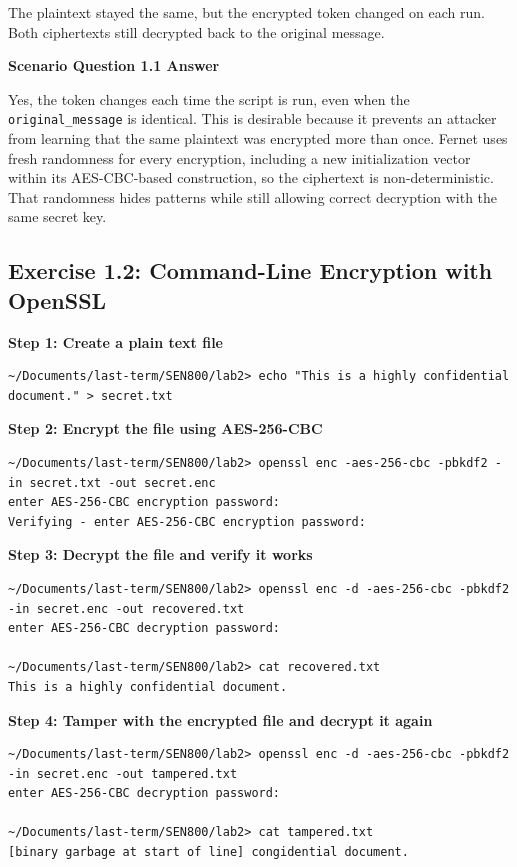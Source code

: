 \documentclass[12pt]{article}
\begin{document}
The plaintext stayed the same, but the encrypted token changed on each run. Both ciphertexts still decrypted back to the original message.

\textbf{Scenario Question 1.1 Answer}

Yes, the token changes each time the script is run, even when the \texttt{original\_message} is identical. This is desirable because it prevents an attacker from learning that the same plaintext was encrypted more than once. Fernet uses fresh randomness for every encryption, including a new initialization vector within its AES-CBC-based construction, so the ciphertext is non-deterministic. That randomness hides patterns while still allowing correct decryption with the same secret key.

\subsection*{Exercise 1.2: Command-Line Encryption with OpenSSL}

\textbf{Step 1: Create a plain text file}

\begin{lstlisting}[style=terminal]
~/Documents/last-term/SEN800/lab2> echo "This is a highly confidential document." > secret.txt
\end{lstlisting}

\textbf{Step 2: Encrypt the file using AES-256-CBC}

\begin{lstlisting}[style=terminal]
~/Documents/last-term/SEN800/lab2> openssl enc -aes-256-cbc -pbkdf2 -in secret.txt -out secret.enc
enter AES-256-CBC encryption password:
Verifying - enter AES-256-CBC encryption password:
\end{lstlisting}

\textbf{Step 3: Decrypt the file and verify it works}

\begin{lstlisting}[style=terminal]
~/Documents/last-term/SEN800/lab2> openssl enc -d -aes-256-cbc -pbkdf2 -in secret.enc -out recovered.txt
enter AES-256-CBC decryption password:

~/Documents/last-term/SEN800/lab2> cat recovered.txt
This is a highly confidential document.
\end{lstlisting}

\textbf{Step 4: Tamper with the encrypted file and decrypt it again}

\begin{lstlisting}[style=terminal]
~/Documents/last-term/SEN800/lab2> openssl enc -d -aes-256-cbc -pbkdf2 -in secret.enc -out tampered.txt
enter AES-256-CBC decryption password:

~/Documents/last-term/SEN800/lab2> cat tampered.txt
[binary garbage at start of line] congidential document.
\end{lstlisting}
\end{document}
